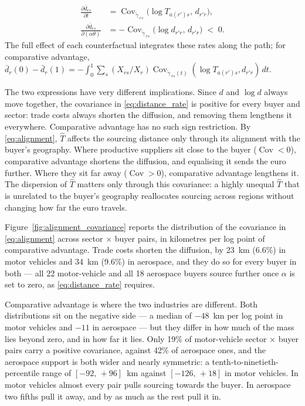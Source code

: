 \begin{align}
\frac{\partial \bar d_{rs}}{\partial t}
&=\operatorname{Cov}_{\tilde\gamma_{\cdot rs}}\!\big(\log T_{a(r')s},\,d_{r'r}\big),
\label{eq:alignment}\\
\frac{\partial \bar d_{rs}}{\partial(\alpha\theta)}
&=-\operatorname{Cov}_{\tilde\gamma_{\cdot rs}}\!\big(\log d_{r'r},\,d_{r'r}\big)\;<\;0.
\label{eq:distance_rate}
\end{align}
The full effect of each counterfactual integrates these rates along the path; for comparative advantage, $\bar d_r(0)-\bar d_r(1) =-\int_0^1\sum_s (X_{rs}/X_r)\operatorname{Cov}_{\tilde\gamma_{\cdot rs}(t)} (\log T_{a(r')s},d_{r'r})\,dt$.

The two expressions have very different implications. Since $d$ and $\log d$ always move together, the covariance in \eqref{eq:distance_rate} is positive for every buyer and sector: trade costs always shorten the diffusion, and removing them lengthens it everywhere. Comparative advantage has no such sign restriction. By \eqref{eq:alignment}, $\hat T$ affects the sourcing distance only through its alignment with the buyer's geography. Where productive suppliers sit close to the buyer ($\operatorname{Cov}<0$), comparative advantage shortens the diffusion, and equalising it sends the euro further. Where they sit far away ($\operatorname{Cov}>0$), comparative advantage lengthens it. The dispersion of $\hat T$ matters only through this covariance: a highly unequal $\hat T$ that is unrelated to the buyer's geography reallocates sourcing across regions without changing how far the euro travels.

Figure~\ref{fig:alignment_covariance} reports the distribution of the covariance in \eqref{eq:alignment} across sector $\times$ buyer pairs, in kilometres per log point of comparative advantage. Trade costs shorten the diffusion, by 23~km (6.6\%) in motor vehicles and 34~km (9.6\%) in aerospace, and they do so for every buyer in both --- all 22 motor-vehicle and all 18 aerospace buyers source further once $\alpha$ is set to zero, as \eqref{eq:distance_rate} requires.

Comparative advantage is where the two industries are different. Both distributions sit on the negative side --- a median of $-48$~km per log point in motor vehicles and $-11$ in aerospace --- but they differ in how much of the mass lies beyond zero, and in how far it lies. Only 19\% of motor-vehicle sector $\times$ buyer pairs carry a positive covariance, against 42\% of aerospace ones, and the aerospace support is both wider and nearly symmetric: a tenth-to-ninetieth-percentile range of $[-92,\,+96]$~km against $[-126,\,+18]$ in motor vehicles. In motor vehicles almost every pair pulls sourcing towards the buyer. In aerospace two fifths pull it away, and by as much as the rest pull it in.

